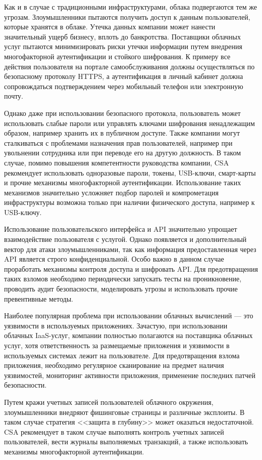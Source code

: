 Как и в случае с традиционными инфраструктурами, облака подвергаются тем же угрозам.
Злоумышленники пытаются получить доступ к данным пользователей, которые хранятся в облаке.
Утечка данных компании может нанести значительный ущерб бизнесу, вплоть до банкротства.
Поставщики облачных услуг пытаются минимизировать риски утечки информации путем внедрения многофакторной аутентификации и стойкого шифрования.
К примеру все действия пользователя на портале самообслуживания должны осуществляться по безопасному протоколу HTTPS, а аутентификация в личный кабинет должна сопровождаться подтверждением через мобильный телефон или электронную почту.

Однако даже при использовании безопасного протокола, пользователь может использовать слабые пароли или управлять ключами шифрования ненадлежащим образом, например хранить их в публичном доступе.
Также компании могут сталкиваться с проблемами назначения прав пользователей, например при увольнении сотрудника или при переводе его на другую должность.
В таком случае, помимо повышения компетентности руководства компании, CSA рекомендует использовать одноразовые пароли, токены, USB-ключи, смарт-карты и прочие механизмы многофакторной аутентификации.
Использование таких механизмов значительно усложняет подбор паролей и компрометация инфраструктуры возможна только при наличии физического доступа, например к USB-ключу.

Использование пользовательского интерфейса и API значительно упрощает взаимодействие пользователя с услугой.
Однако появляется и дополнительный вектор для атаки злоумышленниками, так как информация предоставленная через API является строго конфиденциальной.
Особо важно в данном случае проработать механизмы контроля доступа и шифровать API.
Для предотвращения таких взломов необходимо периодически запускать тесты на проникновение, проводить аудит безопасности, моделировать угрозы и использовать прочие превентивные методы.

Наиболее популярная проблема при использовании облачных вычислений --- это уязвимости в используемых приложениях.
Зачастую, при использовании облачных IaaS-услуг, компании полностью полагаются на поставщика облачных услуг, хотя ответственность за размещаемые приложения и уязвимости в используемых системах лежит на пользователе.
Для предотвращения взлома приложения, необходимо регулярное сканирование на предмет наличия уязвимостей, мониторинг активности приложения, применение последних патчей безопасности.

Путем кражи учетных записей пользователей облачного окружения, злоумышленники внедряют фишинговые страницы и различные эксплоиты.
В таком случае стратегия <<защита в глубину>> может оказаться недостаточной.
CSA рекомендует в таком случае выполнять контроль учетных записей пользователей, вести журналы выполняемых транзакций, а также использовать механизмы многофакторной аутентификации.


